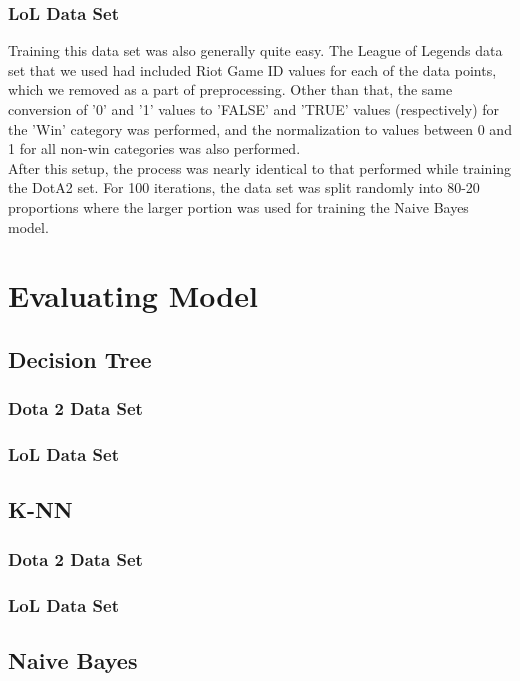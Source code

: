 \documentclass[sigconf]{acmart}
\begin{document}
\subsubsection{LoL Data Set}
Training this data set was also generally quite easy. The League of Legends data set that we used had included Riot Game ID values for each of the data points, which we removed as a part of preprocessing. Other than that, the same conversion of '0' and '1' values to 'FALSE' and 'TRUE' values (respectively) for the 'Win' category was performed, and the normalization to values between 0 and 1 for all non-win categories was also performed.\\
After this setup, the process was nearly identical to that performed while training the DotA2 set. For 100 iterations, the data set was split randomly into 80-20 proportions where the larger portion was used for training the Naive Bayes model.

\section{Evaluating Model}

\subsection{Decision Tree}

\subsubsection{Dota 2 Data Set }

\subsubsection{LoL Data Set}

\subsection{K-NN}

\subsubsection{Dota 2 Data Set }

\subsubsection{LoL Data Set}

\subsection{Naive Bayes}
\end{document}
